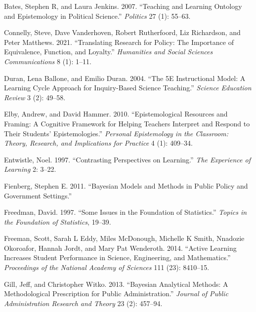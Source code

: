 \documentclass[
  12pt,
  letterpaper,
  DIV=11,
  numbers=noendperiod]{scrartcl}
\newlength{\cslhangindent}
\newlength{\cslentryspacingunit} %
\newenvironment{CSLReferences}[2] %
 {%
  \setlength{\parindent}{0pt}
  \ifodd #1
  \let\oldpar\par
  \def\par{\hangindent=\cslhangindent\oldpar}
  \fi
  \setlength{\parskip}{#2\cslentryspacingunit}
 }%
 {}
\begin{document}
\hypertarget{refs}{}
\begin{CSLReferences}{1}{0}
\leavevmode{}%
Bates, Stephen R, and Laura Jenkins. 2007. {``Teaching and Learning
Ontology and Epistemology in Political Science.''} \emph{Politics} 27
(1): 55--63.

\leavevmode{}%
Connelly, Steve, Dave Vanderhoven, Robert Rutherfoord, Liz Richardson,
and Peter Matthews. 2021. {``Translating Research for Policy: The
Importance of Equivalence, Function, and Loyalty.''} \emph{Humanities
and Social Sciences Communications} 8 (1): 1--11.

\leavevmode{}%
Duran, Lena Ballone, and Emilio Duran. 2004. {``The 5E Instructional
Model: A Learning Cycle Approach for Inquiry-Based Science Teaching.''}
\emph{Science Education Review} 3 (2): 49--58.

\leavevmode{}%
Elby, Andrew, and David Hammer. 2010. {``Epistemological Resources and
Framing: A Cognitive Framework for Helping Teachers Interpret and
Respond to Their Students' Epistemologies.''} \emph{Personal
Epistemology in the Classroom: Theory, Research, and Implications for
Practice} 4 (1): 409--34.

\leavevmode{}%
Entwistle, Noel. 1997. {``Contrasting Perspectives on Learning.''}
\emph{The Experience of Learning} 2: 3--22.

\leavevmode{}%
Fienberg, Stephen E. 2011. {``Bayesian Models and Methods in Public
Policy and Government Settings.''}

\leavevmode{}%
Freedman, David. 1997. {``Some Issues in the Foundation of
Statistics.''} \emph{Topics in the Foundation of Statistics}, 19--39.

\leavevmode{}%
Freeman, Scott, Sarah L Eddy, Miles McDonough, Michelle K Smith,
Nnadozie Okoroafor, Hannah Jordt, and Mary Pat Wenderoth. 2014.
{``Active Learning Increases Student Performance in Science,
Engineering, and Mathematics.''} \emph{Proceedings of the National
Academy of Sciences} 111 (23): 8410--15.

\leavevmode{}%
Gill, Jeff, and Christopher Witko. 2013. {``Bayesian Analytical Methods:
A Methodological Prescription for Public Administration.''}
\emph{Journal of Public Administration Research and Theory} 23 (2):
457--94.


\end{CSLReferences}
\end{document}
